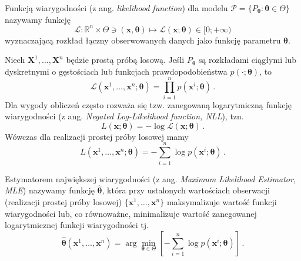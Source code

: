 \documentclass{myclass}
\numberwithin{equation}{subsection}
\begin{document}
\begin{definition}
Funkcją wiarygodności (z ang. \textit{likelihood function}) dla modelu \(\mathcal{P} =
\{P_{\boldsymbol{\theta}} : \boldsymbol{\theta} \in \Theta\}\) nazywamy funkcję
\begin{equation*}
    \mathcal{L}: \mathbb{R}^n \times \Theta \ni (\mathbf{x},\boldsymbol{\theta}) \mapsto \mathcal{L}(\mathbf{x};\boldsymbol{\theta}) \in [0; +\infty)
\end{equation*}
wyznaczającą rozkład łączny obserwowanych danych jako funkcję parametru \(\boldsymbol{\theta}\).    
\end{definition}
Niech \(\mathbf{X}^1,\ldots,\mathbf{X}^n\) będzie prostą próbą losową. Jeśli
\(P_{\boldsymbol{\theta}}\) są rozkładami ciągłymi lub dyskretnymi o gęstościach lub funkcjach
prawdopodobieństwa \(p(\cdot;\boldsymbol{\theta})\), to
\begin{equation}
    \mathcal{L}(\mathbf{x}^1,\ldots,\mathbf{x}^n;\boldsymbol{\theta}) = \prod_{i=1}^n p(\mathbf{x}^i;\boldsymbol{\theta})\,.
\end{equation}
Dla wygody obliczeń często rozważa się tzw. zanegowaną logarytmiczną funkcję wiarygodności (z ang.
\textit{Negated Log-Likelihood function, NLL}), tzn.
\begin{equation}
    L(\mathbf{x};\boldsymbol{\theta}) = - \log \mathcal{L}(\mathbf{x};\boldsymbol{\theta})\,.
\end{equation}
Wówczas dla realizacji prostej próby losowej mamy
\begin{equation}
    L(\mathbf{x}^1,\ldots,\mathbf{x}^n;\boldsymbol{\theta}) = -\sum_{i=1}^n \log p(\mathbf{x}^i;\boldsymbol{\theta})\,.
\end{equation}

\begin{definition}
Estymatorem największej wiarygodności (z ang. \textit{Maximum Likelihood Estimator, MLE}) nazywamy
funkcję \(\boldsymbol{\hat{\theta}}\), która przy ustalonych wartościach obserwacji (realizacji
prostej próby losowej) \(\{\mathbf{x}^1,\ldots,\mathbf{x}^n\}\) maksymalizuje wartość funkcji
wiarygodności lub, co równoważne, minimalizuje wartość zanegowanej logarytmicznej funkcji
wiarygodności tj.
\begin{equation*}
    \boldsymbol{\hat \theta}(\mathbf{x}^1,\ldots,\mathbf{x}^n) = \arg \min_{\boldsymbol{\theta} \in \Theta} \left[- \sum_{i=1}^n \log p(\mathbf{x}^i ; \boldsymbol{\theta})\right]\,.
\end{equation*}
\end{definition}
    
\end{document}

